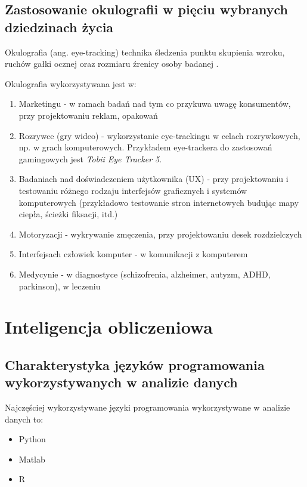 \documentclass[wi]{zut}
\begin{document}
\subsection{Zastosowanie okulografii w pięciu wybranych dziedzinach życia}

Okulografia (ang. eye-tracking) technika śledzenia punktu skupienia wzroku, ruchów gałki ocznej oraz rozmiaru źrenicy osoby badanej \cite{wiki:Okulografia}.

Okulografia wykorzystywana jest w:

\begin{enumerate}
    \item Marketingu - w ramach badań nad tym co przykuwa uwagę konsumentów, przy projektowaniu reklam, opakowań
    \item Rozrywce (gry wideo) - wykorzystanie eye-trackingu w celach rozrywkowych, np. w grach komputerowych. Przykładem eye-trackera do zastosowań gamingowych jest \textit{Tobii Eye Tracker 5}.
    \item Badaniach nad doświadczeniem użytkownika (UX) - przy projektowaniu i testowaniu różnego rodzaju interfejsów graficznych i systemów komputerowych (przykładowo testowanie stron internetowych budując mapy ciepła, ścieżki fiksacji, itd.)
    \item Motoryzacji - wykrywanie zmęczenia, przy projektowaniu desek rozdzielczych
    \item Interfejsach człowiek komputer - w komunikacji z komputerem 
    \item Medycynie - w diagnostyce (schizofrenia, alzheimer, autyzm, ADHD, parkinson), w leczeniu
\end{enumerate}

\section{Inteligencja obliczeniowa}

\subsection{Charakterystyka języków programowania wykorzystywanych w analizie danych}

Najczęściej wykorzystywane języki programowania wykorzystywane w analizie danych to:

\begin{itemize}
    \item Python
    \item Matlab
    \item R
\end{itemize}
\end{document}
